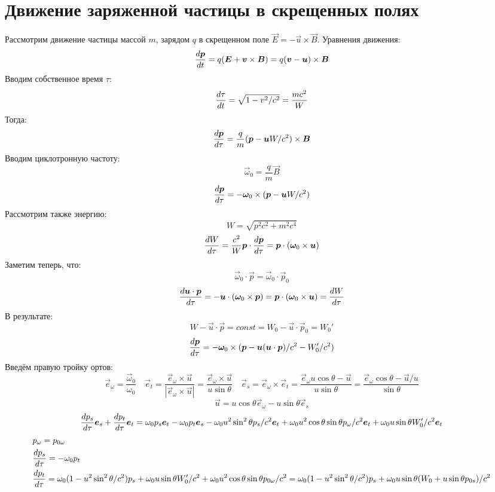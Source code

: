 \section{Движение заряженной частицы в скрещенных полях}
Рассмотрим движение частицы массой $m$, зарядом $q$ в скрещенном поле $\vec{E} = -\vec{u}\times\vec{B}$. Уравнения движения:
\[
	\frac{d \boldsymbol{p}}{d t} = q (\boldsymbol{E} + \boldsymbol{v} \times \boldsymbol{B}) =
	q (\boldsymbol{v} - \boldsymbol{u})\times\boldsymbol{B}
\]
Вводим собственное время $\tau$:
\[
	\frac{d \tau}{d t} = \sqrt{1 - v^2/c^2} = \frac{mc^2}{W}
\]
Тогда:
\[
	\frac{d \boldsymbol{p}}{d \tau} =
	\frac{q}{m} (\boldsymbol{p} - \boldsymbol{u}W/c^2)\times\boldsymbol{B}
\]
Вводим циклотронную частоту:
\[
	\vec{\omega}_0 = \frac{q}{m}\vec{B}
\]
\[
	\frac{d \boldsymbol{p}}{d \tau} =
	- \boldsymbol{\omega}_0\times(\boldsymbol{p} - \boldsymbol{u}W/c^2)
\]
Рассмотрим также энергию:
\[
	W = \sqrt{p^2c^2 + m^2 c^4}
\]
\[
	\frac{d W}{d \tau} = \frac{c^2}{W} \boldsymbol{p}\cdot\frac{d \boldsymbol{p}}{d \tau} = 
	\boldsymbol{p}\cdot(\boldsymbol{\omega}_0\times\boldsymbol{u})
\]
Заметим теперь, что:
\[
	\vec{\omega}_0 \cdot \vec{p} = \vec\omega_0 \cdot \vec{p}_0
\]
\[
	\frac{d \boldsymbol{u}\cdot\boldsymbol{p}}{d \tau} = - \boldsymbol{u}\cdot(\boldsymbol{\omega}_0\times\boldsymbol{p}) = \boldsymbol{p}\cdot(\boldsymbol{\omega}_0\times\boldsymbol{u}) = \frac{d W}{d \tau} 
\]
В результате:
\[	
	W - \vec{u}\cdot\vec{p} = const = W_0 - \vec{u}\cdot\vec{p}_0 = W_0'
\]
\[
	\frac{d \boldsymbol{p}}{d \tau} =
	- \boldsymbol{\omega}_0\times(\boldsymbol{p} - \boldsymbol{u}(\boldsymbol{u}\cdot\boldsymbol{p})/c^2 - W_0'/c^2)
\]
Введём правую тройку ортов:
\[
	\vec{e}_\omega = \frac{\vec\omega_0}{\omega_0} \quad
	\vec{e}_t = \frac{\vec{e}_\omega \times \vec{u}}{|\vec{e}_\omega \times \vec{u}|} = \frac{\vec{e}_\omega \times \vec{u}}{u\sin \theta} \quad
	\vec{e}_s = \vec{e}_\omega\times\vec{e}_t = \frac{\vec{e}_\omega u \cos \theta - \vec{u}}{u\sin \theta} = \frac{\vec{e}_\omega \cos \theta - \vec{u}/u}{\sin \theta}
\]
\[
	\vec{u} = u \cos \theta \vec{e}_\omega - u \sin \theta \vec{e}_s
\]
\[
	\frac{d p_s}{d \tau} \boldsymbol{e}_s + \frac{d p_t}{d \tau} \boldsymbol{e}_t =
	\omega_0 p_s \boldsymbol{e}_t - 
	\omega_0 p_t \boldsymbol{e}_s - 
	\omega_0 u^2 \sin^2 \theta p_s/c^2 \boldsymbol{e}_t + 
	\omega_0 u^2 \cos \theta \sin \theta p_\omega /c^2 \boldsymbol{e}_t +
	\omega_0 u \sin \theta W_0'/c^2 \boldsymbol{e}_t
\]
\[	
	\begin{aligned}
	& p_\omega = p_{0\omega} \\
	& \frac{d p_s}{d \tau} = - \omega_0 p_t \\
	& \frac{d p_t}{d \tau} = \omega_0 (1 - u^2 \sin^2 \theta/c^2) p_s + \omega_0 u \sin \theta W_0'/c^2 + \omega_0 u^2 \cos \theta \sin \theta p_{0\omega} /c^2 =
	\omega_0 (1 - u^2 \sin^2 \theta/c^2) p_s + \omega_0 u \sin \theta (W_0 + u \sin \theta p_{0s})/c^2
	\end{aligned}
\]
